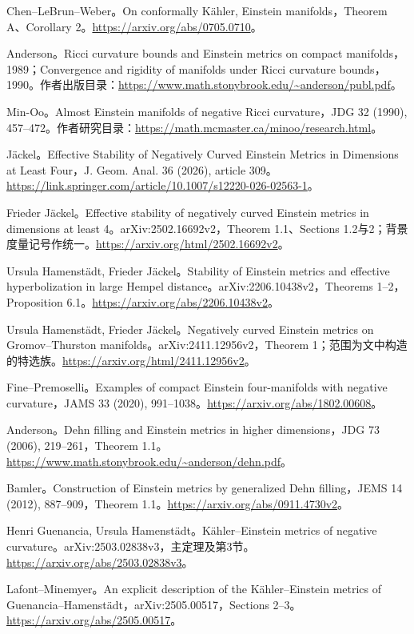 \documentclass[11pt,a4paper]{article}
\theoremstyle{definition}
\begin{document}
\begin{enumerate}[label={[\arabic*]},leftmargin=2.2em,itemsep=0.55em]
\item Chen--LeBrun--Weber。On conformally Kähler, Einstein manifolds，Theorem A、Corollary 2。\url{https://arxiv.org/abs/0705.0710}。
\item Anderson。Ricci curvature bounds and Einstein metrics on compact manifolds，1989；Convergence and rigidity of manifolds under Ricci curvature bounds，1990。作者出版目录：\url{https://www.math.stonybrook.edu/~anderson/publ.pdf}。
\item Min-Oo。Almost Einstein manifolds of negative Ricci curvature，JDG 32 (1990), 457--472。作者研究目录：\url{https://math.mcmaster.ca/minoo/research.html}。
\item Jäckel。Effective Stability of Negatively Curved Einstein Metrics in Dimensions at Least Four，J. Geom. Anal. 36 (2026), article 309。\url{https://link.springer.com/article/10.1007/s12220-026-02563-1}。
\item Frieder Jäckel。Effective stability of negatively curved Einstein metrics in dimensions at least 4。arXiv:2502.16692v2，Theorem 1.1、Sections 1.2与2；背景度量记号作统一。\url{https://arxiv.org/html/2502.16692v2}。
\item Ursula Hamenstädt, Frieder Jäckel。Stability of Einstein metrics and effective hyperbolization in large Hempel distance。arXiv:2206.10438v2，Theorems 1--2，Proposition 6.1。\url{https://arxiv.org/abs/2206.10438v2}。
\item Ursula Hamenstädt, Frieder Jäckel。Negatively curved Einstein metrics on Gromov--Thurston manifolds。arXiv:2411.12956v2，Theorem 1；范围为文中构造的特选族。\url{https://arxiv.org/html/2411.12956v2}。
\item Fine--Premoselli。Examples of compact Einstein four-manifolds with negative curvature，JAMS 33 (2020), 991--1038。\url{https://arxiv.org/abs/1802.00608}。
\item Anderson。Dehn filling and Einstein metrics in higher dimensions，JDG 73 (2006), 219--261，Theorem 1.1。\url{https://www.math.stonybrook.edu/~anderson/dehn.pdf}。
\item Bamler。Construction of Einstein metrics by generalized Dehn filling，JEMS 14 (2012), 887--909，Theorem 1.1。\url{https://arxiv.org/abs/0911.4730v2}。
\item Henri Guenancia, Ursula Hamenstädt。Kähler--Einstein metrics of negative curvature。arXiv:2503.02838v3，主定理及第3节。\url{https://arxiv.org/abs/2503.02838v3}。
\item Lafont--Minemyer。An explicit description of the Kähler--Einstein metrics of Guenancia--Hamenstädt，arXiv:2505.00517，Sections 2--3。\url{https://arxiv.org/abs/2505.00517}。

\end{enumerate}
\end{document}
